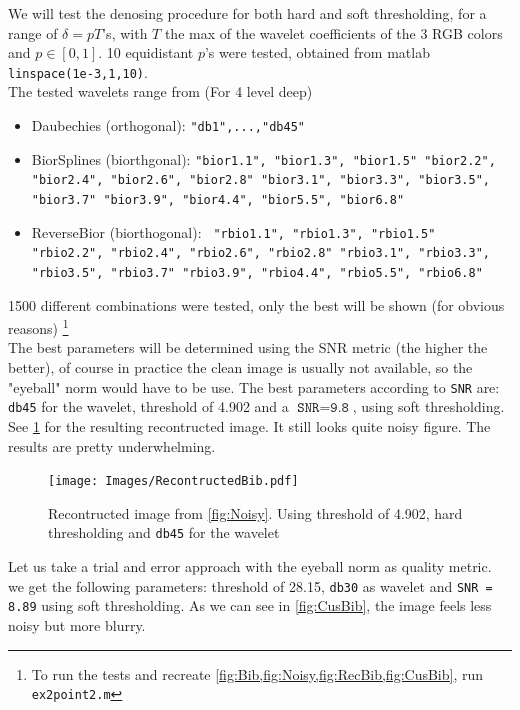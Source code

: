 \documentclass[a4paper]{article}
\begin{document}
	We will test the denosing procedure for both hard and soft thresholding, for a range of $\delta = p T$'s, with $T$ the max of the wavelet coefficients of the 3 RGB colors and $p \in [0,1]$. 10 equidistant $p$'s were tested, obtained from matlab \texttt{linspace(\texttt{1e-3},1,10)}. \\
	The tested wavelets range from (For 4 level deep)
	\begin{itemize}
		\item Daubechies (orthogonal): \texttt{"db1",...,"db45"}
		\item BiorSplines (biorthgonal): \texttt{"bior1.1", "bior1.3", "bior1.5"
			"bior2.2", "bior2.4", "bior2.6", "bior2.8"
			"bior3.1", "bior3.3", "bior3.5", "bior3.7"
			"bior3.9", "bior4.4", "bior5.5", "bior6.8"}	
		\item ReverseBior (biorthogonal): \texttt{	"rbio1.1", "rbio1.3", "rbio1.5"
			"rbio2.2", "rbio2.4", "rbio2.6", "rbio2.8"	
			"rbio3.1", "rbio3.3", "rbio3.5", "rbio3.7"
			"rbio3.9", "rbio4.4", "rbio5.5", "rbio6.8"}
	\end{itemize}
	1500 different combinations were tested, only the best will be shown (for obvious reasons) \footnote{To run the tests and recreate \cref{fig:Bib,fig:Noisy,fig:RecBib,fig:CusBib}, run \texttt{ex2point2.m}} \\
	
	The best parameters will be determined using the SNR metric (the higher the better), of course in practice the clean image is usually not available, so the "eyeball" norm would have to be use. The best parameters according to \texttt{SNR} are: \texttt{db45} for the wavelet, threshold of 4.902 and a $\texttt{SNR} = \texttt{9.8}$, using soft thresholding. See \cref{fig:RecBib} for the resulting recontructed image. It still looks quite noisy figure. The results are pretty underwhelming.

    \begin{figure}[H]
	\centering
	\texttt{[image: Images/RecontructedBib.pdf]}
	\caption{Recontructed image from \cref{fig:Noisy}. Using threshold of 4.902, hard thresholding and \texttt{db45} for the wavelet}
	\label{fig:RecBib}
\end{figure}
	
	Let us take a trial and error approach with the eyeball norm as quality metric. we get the following parameters: threshold of 28.15, \texttt{db30} as wavelet and \texttt{SNR = 8.89} using soft thresholding. As we can see in \cref{fig:CusBib}, the image feels less noisy but more blurry.
	
\end{document}
